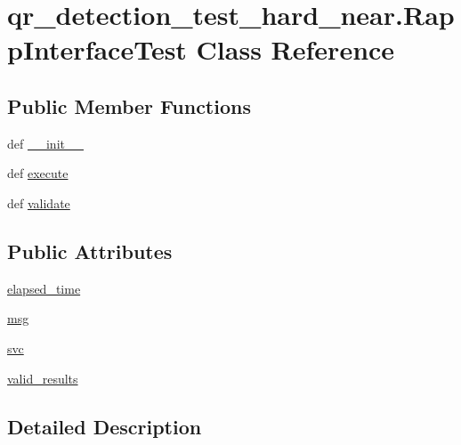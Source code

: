 \hypertarget{classqr__detection__test__hard__near_1_1RappInterfaceTest}{\section{qr\-\_\-detection\-\_\-test\-\_\-hard\-\_\-near.\-Rapp\-Interface\-Test Class Reference}
\label{classqr__detection__test__hard__near_1_1RappInterfaceTest}
}
\subsection*{Public Member Functions}
\begin{DoxyCompactItemize}
\item 
def \hyperlink{classqr__detection__test__hard__near_1_1RappInterfaceTest_aa504e13781ae3f1e33fec9e1615e6e1a}{\-\_\-\-\_\-init\-\_\-\-\_\-}
\item 
def \hyperlink{classqr__detection__test__hard__near_1_1RappInterfaceTest_aff7a9de9bf4a490e8bb0a5b1bd9a83dc}{execute}
\item 
def \hyperlink{classqr__detection__test__hard__near_1_1RappInterfaceTest_a151eaf44f02388eec9467984a142a8d2}{validate}
\end{DoxyCompactItemize}
\subsection*{Public Attributes}
\begin{DoxyCompactItemize}
\item 
\hyperlink{classqr__detection__test__hard__near_1_1RappInterfaceTest_a87150a6c7025abd61a37ae75aadb8c74}{elapsed\-\_\-time}
\item 
\hyperlink{classqr__detection__test__hard__near_1_1RappInterfaceTest_a165f5aae1e1bfcba6a4aa52a497052e5}{msg}
\item 
\hyperlink{classqr__detection__test__hard__near_1_1RappInterfaceTest_a5a3b3c79d292c71bc0c3a0db53840a1d}{svc}
\item 
\hyperlink{classqr__detection__test__hard__near_1_1RappInterfaceTest_a93e2f80f921131bb4efcbdd7004fc57c}{valid\-\_\-results}
\end{DoxyCompactItemize}


\subsection{Detailed Description}


